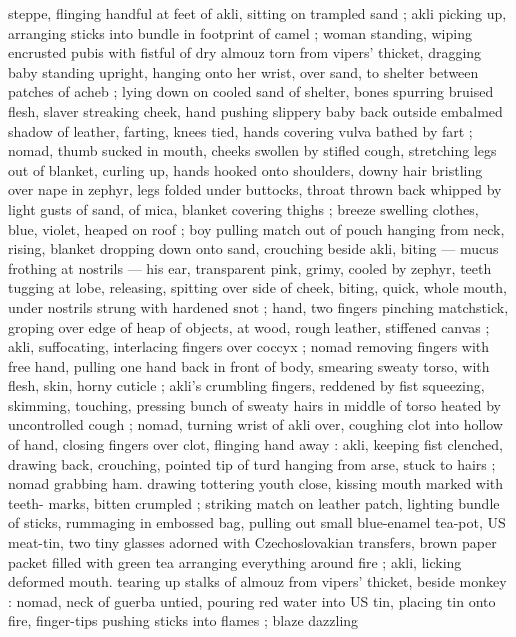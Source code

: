 steppe, flinging handful at feet of akli, sitting on trampled sand ; akli 
picking up, arranging sticks into bundle in footprint of camel ; woman 
standing, wiping encrusted pubis with fistful of dry almouz torn from 
vipers' thicket, dragging baby standing upright, hanging onto her 
wrist, over sand, to shelter between patches of acheb ; lying down on 
cooled sand of shelter, bones spurring bruised flesh, slaver 
streaking cheek, hand pushing slippery baby back outside embalmed 
shadow of leather, farting, knees tied, hands covering vulva bathed 
by fart ; nomad, thumb sucked in mouth, cheeks swollen by stifled 
cough, stretching legs out of blanket, curling up, hands hooked onto 
shoulders, downy hair bristling over nape in zephyr, legs folded 
under buttocks, throat thrown back whipped by light gusts of sand, 
of mica, blanket covering thighs ; breeze swelling clothes, blue, 
violet, heaped on roof ; boy pulling match out of pouch hanging from 
neck, rising, blanket dropping down onto sand, crouching beside akli, 
biting --- mucus frothing at nostrils --- his ear, transparent pink, 
grimy, cooled by zephyr, teeth tugging at lobe, releasing, spitting 
over side of cheek, biting, quick, whole mouth, under nostrils strung 
with hardened snot ; hand, two fingers pinching matchstick, groping 
over edge of heap of objects, at wood, rough leather, stiffened 
canvas ; akli, suffocating, interlacing fingers over coccyx ; nomad 
removing fingers with free hand, pulling one hand back in front of 
body, smearing sweaty torso, with flesh, skin, horny cuticle ; akli's 
crumbling fingers, reddened by fist squeezing, skimming, touching, 
pressing bunch of sweaty hairs in middle of torso heated by 
uncontrolled cough ; nomad, turning wrist of akli over, coughing clot 
into hollow of hand, closing fingers over clot, flinging hand away : 
akli, keeping fist clenched, drawing back, crouching, pointed tip of 
turd hanging from arse, stuck to hairs ; nomad grabbing ham. 
drawing tottering youth close, kissing mouth marked with teeth- 
marks, bitten crumpled ; striking match on leather patch, lighting 
bundle of sticks, rummaging in embossed bag, pulling out small 
blue-enamel tea-pot, US meat-tin, two tiny glasses adorned with 
Czechoslovakian transfers, brown paper packet filled with green tea 
{\col} arranging everything around fire ; akli, licking deformed mouth. 
tearing up stalks of almouz from vipers' thicket, beside monkey : 
nomad, neck of guerba untied, pouring red water into US tin, placing 
tin onto fire, finger-tips pushing sticks into flames ; blaze dazzling 
